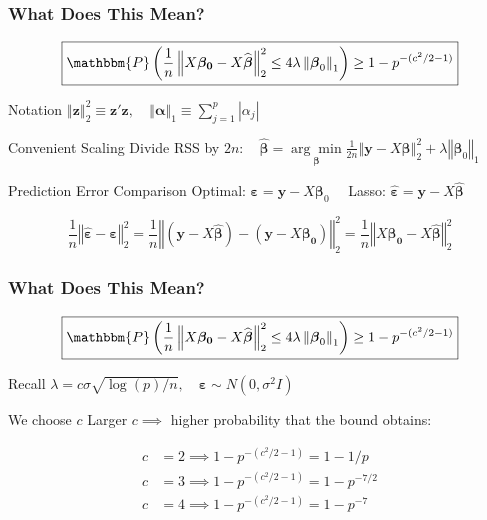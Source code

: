 \begin{frame}
  \frametitle{What Does This Mean?}
    \[
      \boxed{\mathbbm{P}\left(\frac{1}{n}\left\Vert X\boldsymbol{\beta_0} - X\widehat{\boldsymbol{\beta}} \right\Vert_2^2 \leq 4 \lambda \left \Vert \boldsymbol{\beta}_0 \right\Vert_1\right) \geq 1 - p^{-(c^2/2 - 1)}}
    \]

  \begin{block}{Notation}
    $\left\Vert \mathbf{z} \right\Vert_2^2 \equiv \mathbf{z}'\mathbf{z}, \quad \left\Vert \boldsymbol{\alpha} \right\Vert_1 \equiv \sum_{j=1}^p \left| \alpha_j \right|$
  \end{block}

  \begin{block}{Convenient Scaling} 
    Divide RSS by $2n\colon \quad \widehat{\boldsymbol{\beta}} = \underset{\boldsymbol{\beta}}{\arg \min} \displaystyle\frac{1}{2n} \left\Vert \mathbf{y} - X\boldsymbol{\beta}\right\Vert_2^2 +  \lambda \left\Vert \boldsymbol{\beta}_0\right\Vert_1$
  \end{block}
  
  \begin{block}{Prediction Error Comparison} 
    Optimal: $\boldsymbol{\varepsilon} = \mathbf{y} - X\boldsymbol{\beta}_0\quad$ Lasso: $\widehat{\boldsymbol{\varepsilon}} = \boldsymbol{y} - X\boldsymbol{\widehat{\boldsymbol{\beta}}}$

    \[
      \frac{1}{n}\left\Vert \widehat{\boldsymbol{\varepsilon}} - \boldsymbol{\varepsilon} \right\Vert_2^2  = 
      \frac{1}{n}\left\Vert (\mathbf{y} - X\widehat{\boldsymbol{\beta}}) - (\mathbf{y} - X\boldsymbol{\beta_0}) \right\Vert_2^2  = \frac{1}{n}\left\Vert X\boldsymbol{\beta_0} - X\widehat{\boldsymbol{\beta}} \right\Vert_2^2
    \]
  \end{block}
\end{frame}
\begin{frame}
  \frametitle{What Does This Mean?}
    \[
      \boxed{\mathbbm{P}\left(\frac{1}{n}\left\Vert X\boldsymbol{\beta_0} - X\widehat{\boldsymbol{\beta}} \right\Vert_2^2 \leq 4 \lambda \left \Vert \boldsymbol{\beta}_0 \right\Vert_1\right) \geq 1 - p^{-(c^2/2 - 1)}}
    \]

    \begin{block}{Recall}
      $\lambda = c \sigma \sqrt{\log(p)/n}, \quad \boldsymbol{\varepsilon} \sim N(0, \sigma^2 I)$
    \end{block}

    \begin{block}{We choose $c$}
      Larger $c \implies$ higher probability that the bound obtains:

      \begin{align*}
        c &= 2 \implies 1 - p^{-(c^2/2 - 1)} = 1 - 1/p\\
        c &= 3 \implies 1 - p^{-(c^2/2 - 1)} = 1 - p^{-7/2}\\
        c &= 4 \implies 1 - p^{-(c^2/2 - 1)} = 1 - p^{-7}
      \end{align*}
    \end{block}

\end{frame}
